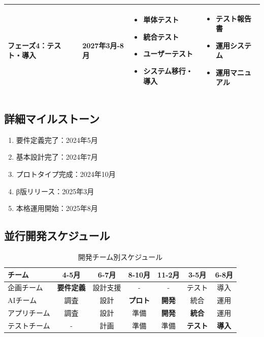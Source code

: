 \documentclass[12pt,a4paper]{jsarticle}
\begin{document}
\begin{longtable}{|p{3cm}|p{2.5cm}|p{6cm}|p{3cm}|}
フェーズ4：テスト・導入 & 2027年3月-8月 & 
\begin{itemize}
\item 単体テスト
\item 統合テスト
\item ユーザーテスト
\item システム移行・導入
\end{itemize} & 
\begin{itemize}
\item テスト報告書
\item 運用システム
\item 運用マニュアル
\end{itemize} \\
\hline
\end{longtable}

\subsection{詳細マイルストーン}
\begin{enumerate}
    \item 要件定義完了：2024年5月
    \item 基本設計完了：2024年7月
    \item プロトタイプ完成：2024年10月
    \item β版リリース：2025年3月
    \item 本格運用開始：2025年8月
\end{enumerate}

\subsection{並行開発スケジュール}
\begin{table}[h]
\centering
\caption{開発チーム別スケジュール}
\begin{tabular}{|l|c|c|c|c|c|c|}
\hline
\textbf{チーム} & \textbf{4-5月} & \textbf{6-7月} & \textbf{8-10月} & \textbf{11-2月} & \textbf{3-5月} & \textbf{6-8月} \\
\hline
企画チーム & \textbf{要件定義} & 設計支援 & - & - & テスト & 導入 \\
\hline
AIチーム & 調査 & 設計 & \textbf{プロト} & \textbf{開発} & 統合 & 運用 \\
\hline
アプリチーム & 調査 & 設計 & 準備 & \textbf{開発} & \textbf{統合} & 運用 \\
\hline
テストチーム & - & 計画 & 準備 & 準備 & \textbf{テスト} & \textbf{導入} \\
\hline
\end{tabular}
\end{table}
\end{document}
